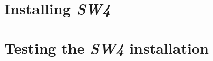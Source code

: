 \documentclass[11pt]{report}
\begin{document}


\chapter{Installing \emph{SW4}}\label{cha:installing-sw4}

\chapter{Testing the \emph{SW4} installation}\label{cha:testing-sw4}



 
\end{document}
